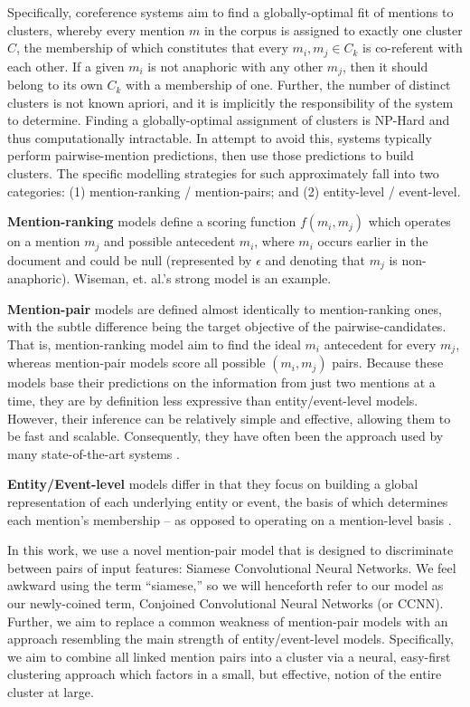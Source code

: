 \documentclass[11pt,a4paper]{article}
\begin{document}
Specifically, coreference systems aim to find a globally-optimal fit of mentions to clusters, whereby every mention $m$ in the corpus is assigned to exactly one cluster $C$, the membership of which constitutes that every ${m_i,m_j} \in C_k$ is co-referent with each other.  If a given $m_i$ is not anaphoric with any other $m_j$, then it should belong to its own $C_k$ with a membership of one.  Further, the number of distinct clusters is not known apriori, and it is implicitly the responsibility of the system to determine.  Finding a globally-optimal assignment of clusters is NP-Hard and thus computationally intractable.  In attempt to avoid this, systems typically perform pairwise-mention predictions, then use those predictions to build clusters. The specific modelling strategies for such approximately fall into two categories: (1) mention-ranking / mention-pairs; and (2) entity-level / event-level.

\textbf{Mention-ranking} models define a scoring function $f(m_i,m_j)$ which operates on a mention $m_j$ and possible antecedent $m_i$, where $m_i$ occurs earlier in the document and could be null (represented by $\epsilon$ and denoting that $m_j$ is non-anaphoric).  Wiseman, et. al.'s  strong model is an example.

\textbf{Mention-pair} models are defined almost identically to mention-ranking ones, with the subtle difference being the target objective of the pairwise-candidates.  That is, mention-ranking model aim to find the ideal $m_i$ antecedent for every $m_j$, whereas mention-pair models score all possible $(m_i,m_j)$ pairs.  Because these models base their predictions on the information from just two mentions at a time, they are by definition less expressive than entity/event-level models.  However, their inference can be relatively simple and effective, allowing them to be fast and scalable.  Consequently, they have often been the approach used by many state-of-the-art systems \cite{Soon:2001:MLA:972597.972602,DBLP:conf/emnlp/DurrettK13}.

\textbf{Entity/Event-level} models differ in that they focus on building a global representation of each underlying entity or event, the basis of which determines each mention's membership -- as opposed to operating on a mention-level basis \cite{DBLP:journals/corr/WisemanRS16,clark2016improving}.

In this work, we use a novel mention-pair model that is designed to discriminate between pairs of input features: Siamese Convolutional Neural Networks.  We feel awkward using the term ``siamese,'' so we will henceforth refer to our model as our newly-coined term, Conjoined Convolutional Neural Networks (or CCNN).  Further, we aim to replace a common weakness of mention-pair models with an approach resembling the main strength of entity/event-level models. Specifically, we aim to combine all linked mention pairs into a cluster via a neural, easy-first clustering approach which factors in a small, but effective, notion of the entire cluster at large.
\end{document}
